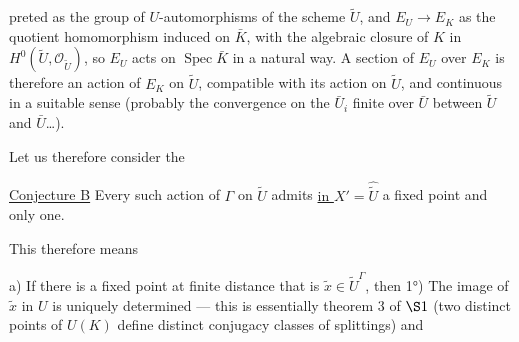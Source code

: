 preted as the  group of $U$-automorphisms of the scheme $\widetilde U$, and $E_U\longrightarrow E_K$ as the quotient homomorphism induced on $\bar K$,  with the algebraic closure of $K$ in $H^0(\widetilde U,\mathcal O_{\widetilde U})$, so $E_U$ acts on $\operatorname{Spec}\bar K$ in a natural way. A section of $E_U$ over $E_K$ is therefore an action of $E_K$ on $\widetilde U$, compatible with its action on $\widetilde U$, and continuous in a suitable sense (probably the  convergence on the  $\bar U_i$ finite over $\bar U$ between $\widetilde U$ and $\bar U$\ldots).

Let us therefore consider the

\uline{Conjecture B} Every such action of $\Gamma$ on $\widetilde U$ admits \uline{in $X'$}$=\widehat{\widetilde U}$ a fixed point and only one.

This therefore means

a) If there is a fixed point at finite distance that is $\widetilde x\in\widetilde U^\Gamma$, then 1°) The image of $\widetilde x$ in $U$ is uniquely determined --- this is essentially theorem 3 of $\S1$ (two distinct points of $U(K)$ define distinct conjugacy classes of splittings) and
